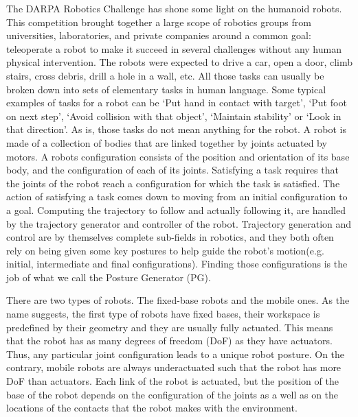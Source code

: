 The DARPA Robotics Challenge has shone some light on the humanoid robots.
This competition brought together a large scope of robotics groups from universities, laboratories, and private companies around a common goal: teleoperate a robot to make it succeed in several challenges without any human physical intervention.
The robots were expected to drive a car, open a door, climb stairs, cross debris, drill a hole in a wall, etc.
All those tasks can usually be broken down into sets of elementary tasks in human language.
Some typical examples of tasks for a robot can be `Put hand in contact with target', `Put foot on next step', `Avoid collision with that object', `Maintain stability' or `Look in that direction'.
As is, those tasks do not mean anything for the robot.
A robot is made of a collection of bodies that are linked together by joints actuated by motors.
A robots configuration consists of the position and orientation of its base body, and the configuration of each of its joints.
Satisfying a task requires that the joints of the robot reach a configuration for which the task is satisfied.
The action of satisfying a task comes down to moving from an initial configuration to a goal.
Computing the trajectory to follow and actually following it, are handled by the trajectory generator and controller of the robot.
Trajectory generation and control are by themselves complete sub-fields in robotics, and they both often rely on being given some key postures to help guide the robot's motion(e.g. initial, intermediate and final configurations).
Finding those configurations is the job of what we call the Posture Generator (PG).

There are two types of robots. The fixed-base robots and the mobile ones.
As the name suggests, the first type of robots have fixed bases, their workspace is predefined by their geometry and they are usually fully actuated.
This means that the robot has as many degrees of freedom (DoF) as they have actuators. Thus, any particular joint configuration leads to a unique robot posture.
On the contrary, mobile robots are always underactuated such that the robot has more DoF than actuators.
Each link of the robot is actuated, but the position of the base of the robot depends on the configuration of the joints as a well as on the locations of the contacts that the robot makes with the environment.


